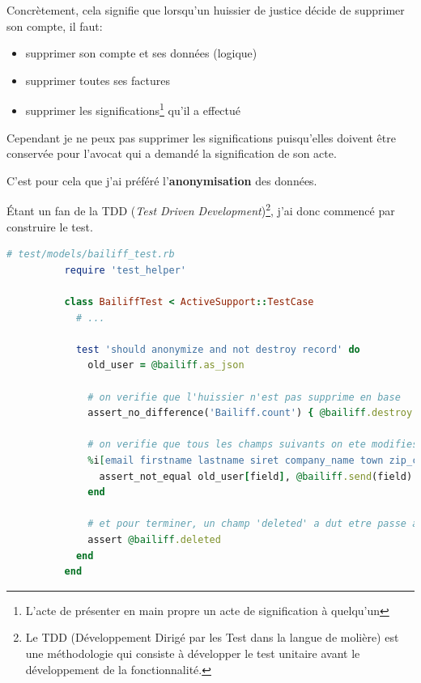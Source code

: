 \documentclass[]{report}
\begin{document}
        Concrètement, cela signifie que lorsqu'un huissier de justice décide de supprimer son compte, il faut:

        \begin{itemize}
          \item supprimer son compte et ses données (logique)
          \item supprimer toutes ses factures
          \item supprimer les significations\footnote{L'acte de présenter en main propre un acte de signification à quelqu'un} qu'il a effectué
        \end{itemize}

        Cependant je ne peux pas supprimer les significations puisqu'elles doivent être conservée pour l'avocat qui a demandé la signification de son acte.

        C'est pour cela que j'ai préféré l'\textbf{anonymisation} des données.

        Étant un fan de la TDD (\textit{Test Driven Development})\footnote{Le TDD (Développement Dirigé par les Test dans la langue de molière) est une méthodologie qui consiste à développer le test unitaire avant le développement de la fonctionnalité.}, j'ai donc commencé par construire le test.

        \begin{scriptsize}
          \begin{lstlisting}[language=ruby]
          # test/models/bailiff_test.rb
          require 'test_helper'

          class BailiffTest < ActiveSupport::TestCase
            # ...

            test 'should anonymize and not destroy record' do
              old_user = @bailiff.as_json

              # on verifie que l'huissier n'est pas supprime en base
              assert_no_difference('Bailiff.count') { @bailiff.destroy }

              # on verifie que tous les champs suivants on ete modifies
              %i[email firstname lastname siret company_name town zip_code address_2 address_1].each do |field|
                assert_not_equal old_user[field], @bailiff.send(field)
              end

              # et pour terminer, un champ 'deleted' a dut etre passe a 'true'
              assert @bailiff.deleted
            end
          end
          \end{lstlisting}
        \end{scriptsize}
\end{document}
